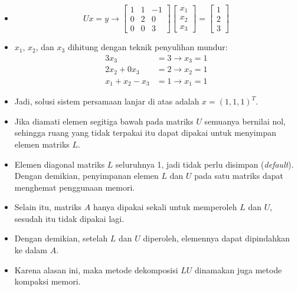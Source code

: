 \documentclass[pdflatex,compress,mathserif]{beamer}
\begin{document}
\begin{frame}
	\begin{itemize}
		\item[] 
		\[ Ux = y \rightarrow \begin{bmatrix}
		1 & 1 & -1 \\ 0 & 2 & 0 \\ 0 & 0 & 3
		\end{bmatrix} \begin{bmatrix}
		x_1 \\ x_2 \\ x_3
		\end{bmatrix} = \begin{bmatrix}
		1 \\ 2 \\ 3
		\end{bmatrix}\]
		\item $ x_1 $, $ x_2 $, dan $ x_3 $ dihitung dengan teknik penyulihan mundur:
		\begin{align*}
		3x_3 &= 3 \rightarrow x_3 = 1 \\
		2x_2 + 0x_3 &= 2 \rightarrow x_2 = 1 \\
		x_1 + x_2 - x_3 &= 1 \rightarrow x_1 = 1
		\end{align*}
		\item Jadi, solusi sistem persamaan lanjar di atas adalah $ x = (1, 1, 1)^T $.
	\end{itemize}
\end{frame}

\begin{frame}
	\begin{itemize}
		\item Jika diamati elemen segitiga bawah pada matriks $ U $ semuanya bernilai nol, sehingga ruang yang tidak terpakai itu dapat dipakai untuk menyimpan elemen matriks $ L $.
		\item Elemen diagonal matriks $ L $ seluruhnya 1, jadi tidak perlu disimpan (\textit{default}). Dengan demikian, penyimpanan elemen $ L $ dan $ U $ pada satu matriks dapat menghemat penggunaan memori.
		\item Selain itu, matriks $ A $ hanya dipakai sekali untuk
		memperoleh $ L $ dan $ U $, sesudah itu tidak dipakai lagi.
		\item Dengan demikian, setelah $ L $ dan $ U $ diperoleh, elemennya dapat dipindahkan ke dalam $ A $.
		\item Karena alasan ini, maka metode dekomposisi $ LU $ dinamakan juga metode kompaksi memori.
	\end{itemize}
\end{frame}
\end{document}
